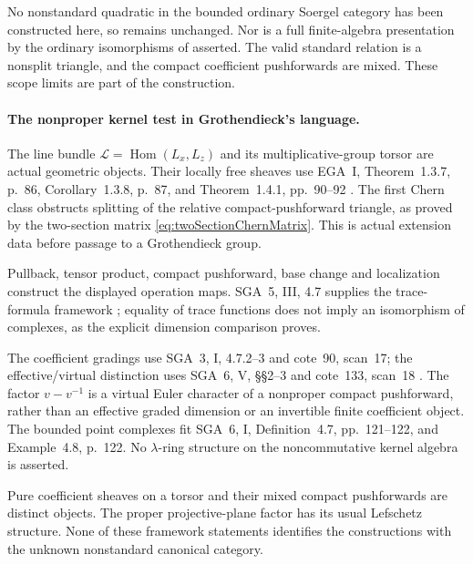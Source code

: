 No nonstandard quadratic in the bounded ordinary Soergel
category has been constructed here, so  remains
unchanged. Nor is a full finite-algebra presentation by the
ordinary isomorphisms of  asserted. The valid
standard relation is a nonsplit triangle, and the compact
coefficient pushforwards are mixed. These scope limits are
part of the construction.

\paragraph{The nonproper kernel test in Grothendieck's language.}
The line bundle
\(\mathcal L=\operatorname{Hom}(L_x,L_z)\) and its
multiplicative-group torsor are actual geometric objects.
Their locally free sheaves use EGA~I, Theorem~1.3.7, p.~86,
Corollary~1.3.8, p.~87, and Theorem~1.4.1, pp.~90--92
\cite{EGA}. The first Chern class obstructs splitting of
the relative compact-pushforward triangle, as proved by
the two-section matrix \eqref{eq:twoSectionChernMatrix}.
This is actual extension data before passage to a
Grothendieck group.

Pullback, tensor product, compact pushforward, base change
and localization construct the displayed operation maps.
SGA~5, III, 4.7 supplies the trace-formula framework
\cite{SGA5}; equality of trace functions does not imply
an isomorphism of complexes, as the explicit dimension
comparison proves.

The coefficient gradings use SGA~3, I, 4.7.2--3 and
cote~90, scan~17; the effective/virtual distinction uses
SGA~6, V, \S\S2--3 and cote~133, scan~18
\cite{SGA3,SGA6,Archive}.
The factor \(v-v^{-1}\) is a virtual Euler character
of a nonproper compact pushforward, rather than an
effective graded dimension or an invertible finite
coefficient object. The bounded point complexes fit
SGA~6, I, Definition~4.7, pp.~121--122, and
Example~4.8, p.~122.
No \(\lambda\)-ring structure on the noncommutative
kernel algebra is asserted.

Pure coefficient sheaves on a torsor and their mixed
compact pushforwards are distinct objects. The proper
projective-plane factor has its usual Lefschetz
structure. None of these framework statements identifies
the constructions with the unknown nonstandard canonical
category.

